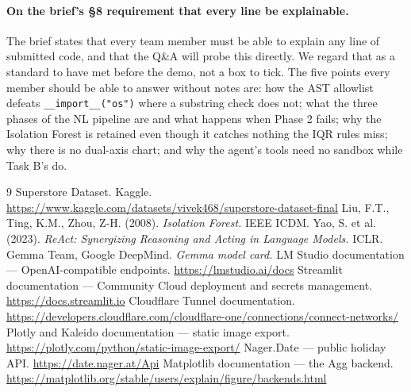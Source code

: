 \documentclass[11pt,a4paper]{article}
\begin{document}
\paragraph{On the brief's \S8 requirement that every line be explainable.} The brief states that
every team member must be able to explain any line of submitted code, and that the Q\&A
will probe this directly. We regard that as a standard to have met before the demo, not
a box to tick. The five points every member should be able to answer without notes are:
how the AST allowlist defeats \texttt{\_\_import\_\_("os")} where a substring check does
not; what the three phases of the NL pipeline are and what happens when Phase 2 fails;
why the Isolation Forest is retained even though it catches nothing the IQR rules miss;
why there is no dual-axis chart; and why the agent's tools need no sandbox while Task B's
do.

\begin{thebibliography}{9}
 Superstore Dataset. Kaggle. \url{https://www.kaggle.com/datasets/vivek468/superstore-dataset-final}
 Liu, F.T., Ting, K.M., Zhou, Z-H. (2008). \emph{Isolation Forest.} IEEE ICDM.
 Yao, S. et al. (2023). \emph{ReAct: Synergizing Reasoning and Acting in Language Models.} ICLR.
 Gemma Team, Google DeepMind. \emph{Gemma model card.}
 LM Studio documentation --- OpenAI-compatible endpoints. \url{https://lmstudio.ai/docs}
 Streamlit documentation --- Community Cloud deployment and secrets management. \url{https://docs.streamlit.io}
 Cloudflare Tunnel documentation. \url{https://developers.cloudflare.com/cloudflare-one/connections/connect-networks/}
 Plotly and Kaleido documentation --- static image export. \url{https://plotly.com/python/static-image-export/}
 Nager.Date --- public holiday API. \url{https://date.nager.at/Api}
 Matplotlib documentation --- the Agg backend. \url{https://matplotlib.org/stable/users/explain/figure/backends.html}
\end{thebibliography}
\end{document}
